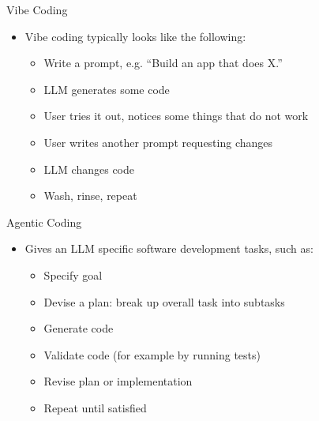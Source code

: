 \documentclass[
ps,
]{prosper}
\begin{document}
\begin{slide}{Vibe Coding}

\begin{itemize}

\item Vibe coding typically looks like the following:

\begin{itemize}

\item Write a prompt, e.g. ``Build an app that does X.''

\item LLM generates some code

\item User tries it out, notices some things that do not work

\item User writes another prompt requesting changes

\item LLM changes code

\item Wash, rinse, repeat

\end{itemize}
  

\end{itemize}
  
\end{slide}



\begin{slide}{Agentic Coding}

\begin{itemize}

\item Gives an LLM specific software development tasks,
  such as:

\begin{itemize}

\item Specify goal

\item Devise a plan: break up overall task into subtasks

\item Generate code

\item Validate code (for example by running tests)

\item Revise plan or implementation

\item Repeat until satisfied

\end{itemize}

\end{itemize}
  
\end{slide}
\end{document}
